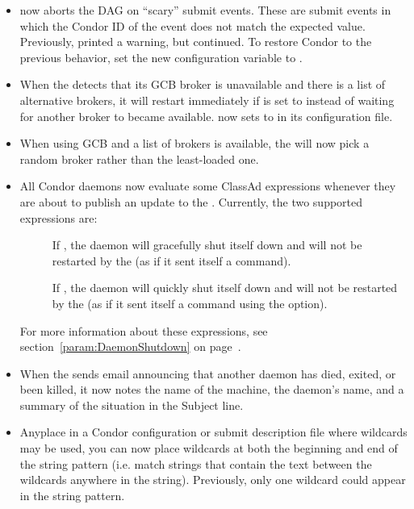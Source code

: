\begin{itemize}
\item {} now aborts the DAG on ``scary'' submit events.
These are submit events in which
the Condor ID of the event does not match the
expected value.
Previously,  printed a warning, but continued.
To restore Condor to the previous behavior,
set the new  configuration variable
to .

\item When the  detects that its GCB broker is unavailable
and there is a list of alternative brokers,
it will restart immediately if  is
set to  instead of waiting for another broker to became available.
 now sets 
to   in its configuration file.

\item When using GCB and a list of brokers is available, the
 will now pick a random broker rather than the least-loaded
one.

\item All Condor daemons now evaluate some ClassAd expressions
  whenever they are about to publish an update to the
  .
  Currently, the two supported expressions are:
  \begin{description}
  \item[]
    If , the daemon will gracefully shut itself down and will not
    be restarted by the  (as if it sent itself a
     command).
  \item[]
    If , the daemon will quickly shut itself down and will not be
    restarted by the  (as if it sent itself a
     command using the  option).
  \end{description}
  For more information about these expressions, see
  section~\ref{param:DaemonShutdown} on
  page~\pageref{param:DaemonShutdown}.

\item When the  sends email announcing that another daemon has
died, exited, or been killed, it now notes the name of the machine, the
daemon's name, and a summary of the situation in the Subject line.

\item Anyplace in a Condor configuration or submit description file where
wildcards may be used, you can now place wildcards at both the beginning
and end of the string pattern (i.e. match strings that contain the text
between the wildcards anywhere in the string). Previously, only one
wildcard could appear in the string pattern.


\end{itemize}
